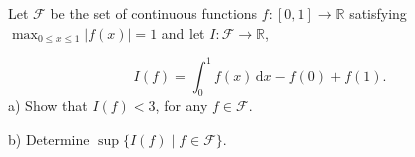 Let $\mathcal{F}$ be the set of continuous functions $f : [0, 1]\to\mathbb{R}$ satisfying $\max_{0\le x\le 1} |f(x)| = 1$ and let $I : \mathcal{F} \to \mathbb{R}$,

\[I(f) = \int_0^1 f(x)\, \text{d}x - f(0) + f(1).\]
a) Show that $I(f) < 3$, for any $f \in \mathcal{F}$.

b) Determine $\sup\{I(f) \mid f \in \mathcal{F}\}$.